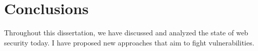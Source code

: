 \chapter{Conclusions}

Throughout this dissertation, we have discussed and analyzed the state
of web security today. I have proposed new approaches that aim to
fight vulnerabilities. 
